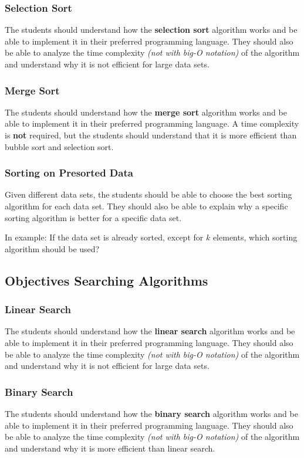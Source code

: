 \documentclass[10pt, oneside]{article}
\theoremstyle{remark}
\begin{document}
\subsubsection{Selection Sort}
The students should understand how the \textbf{selection sort} algorithm works and be able to implement it in their preferred programming language. They should also be able to analyze the time complexity \textit{(not with big-O notation)} of the algorithm and understand why it is not efficient for large data sets.

\subsubsection{Merge Sort}
The students should understand how the \textbf{merge sort} algorithm works and be able to implement it in their preferred programming language. A time complexity is \textbf{not} required, but the students should understand that it is more efficient than bubble sort and selection sort.

\subsubsection{Sorting on Presorted Data}
Given different data sets, the students should be able to choose the best sorting algorithm for each data set. They should also be able to explain why a specific sorting algorithm is better for a specific data set.

In example: If the data set is already sorted, except for $k$ elements, which sorting algorithm should be used?

\subsection{Objectives Searching Algorithms}

\subsubsection{Linear Search}
The students should understand how the \textbf{linear search} algorithm works and be able to implement it in their preferred programming language. They should also be able to analyze the time complexity \textit{(not with big-O notation)} of the algorithm and understand why it is not efficient for large data sets.

\subsubsection{Binary Search}
The students should understand how the \textbf{binary search} algorithm works and be able to implement it in their preferred programming language. They should also be able to analyze the time complexity \textit{(not with big-O notation)} of the algorithm and understand why it is more efficient than linear search.
\end{document}

